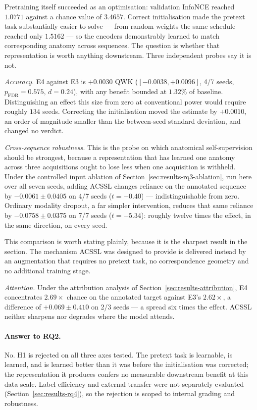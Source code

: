 \documentclass[12pt,a4paper]{report}
\begin{document}
Pretraining itself succeeded as an optimisation: validation InfoNCE reached
$1.0771$ against a chance value of $3.4657$. Correct initialisation made the
pretext task substantially easier to solve --- from random weights the same
schedule reached only $1.5162$ --- so the encoders demonstrably learned to match
corresponding anatomy across sequences. The question is whether that
representation is worth anything downstream. Three independent probes say it is
not.

\emph{Accuracy.} E4 against E3 is $+0.0030$ QWK ($[-0.0038, +0.0096]$, 4/7
seeds, $p_{\mathrm{FDR}} = 0.575$, $d = 0.24$), with any benefit bounded at
$1.32\%$ of baseline. Distinguishing an effect this size from zero at
conventional power would require roughly $134$ seeds. Correcting the
initialisation moved the estimate by $+0.0010$, an order of magnitude smaller
than the between-seed standard deviation, and changed no verdict.

\emph{Cross-sequence robustness.} This is the probe on which anatomical
self-supervision should be strongest, because a representation that has learned
one anatomy across three acquisitions ought to lose less when one acquisition is
withheld. Under the controlled input ablation of
Section~\ref{sec:results-rq3-ablation}, run here over all seven seeds, adding
ACSSL changes reliance on the annotated sequence by $-0.0061 \pm 0.0405$ on 4/7
seeds ($t = -0.40$) --- indistinguishable from zero. Ordinary modality dropout,
a far simpler intervention, reduces that same reliance by $-0.0758 \pm 0.0375$
on 7/7 seeds ($t = -5.34$): roughly twelve times the effect, in the same
direction, on every seed.

This comparison is worth stating plainly, because it is the sharpest result in
the section. The mechanism ACSSL was designed to provide is delivered instead by
an augmentation that requires no pretext task, no correspondence geometry and no
additional training stage.

\emph{Attention.} Under the attribution analysis of
Section~\ref{sec:results-attribution}, E4 concentrates $2.69\times$ chance on
the annotated target against E3's $2.62\times$, a difference of
$+0.069 \pm 0.410$ on 2/3 seeds --- a spread six times the effect. ACSSL neither
sharpens nor degrades where the model attends.

\paragraph{Answer to RQ2.} No. H1 is rejected on all three axes tested. The
pretext task is learnable, is learned, and is learned better than it was before
the initialisation was corrected; the representation it produces confers no
measurable downstream benefit at this data scale. Label efficiency and external
transfer were not separately evaluated (Section~\ref{sec:results-rq4}), so the
rejection is scoped to internal grading and robustness.
\end{document}
